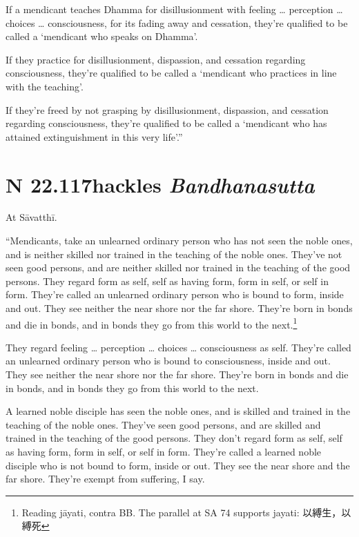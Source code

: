 \documentclass[12pt,openany]{book}%
\newcommand*{\suttatitleacronym}[1]{\smaller[2]{#1}\vspace*{.3em}}
\newcommand*{\suttatitletranslation}[1]{\linebreak{#1}}
\newcommand*{\suttatitleroot}[1]{\linebreak\smaller[2]\itshape{#1}}
\newcommand*{\tocacronym}[1]{\hspace*{-3.3em}{#1}\quad}
\newcommand*{\toctranslation}[1]{#1}
\newcommand*{\tocroot}[1]{(\textit{#1})}
\begin{document}
If a mendicant teaches Dhamma for disillusionment with feeling … perception … choices … consciousness, for its fading away and cessation, they’re qualified to be called a ‘mendicant who speaks on Dhamma’. 

If they practice for disillusionment, dispassion, and cessation regarding consciousness, they’re qualified to be called a ‘mendicant who practices in line with the teaching’. 

If they’re freed by not grasping by disillusionment, dispassion, and cessation regarding consciousness, they’re qualified to be called a ‘mendicant who has attained extinguishment in this very life’.” 

%
\section*{{\suttatitleacronym SN 22.117}{\suttatitletranslation Shackles }{\suttatitleroot Bandhanasutta}}
\addcontentsline{toc}{section}{\tocacronym{SN 22.117} \toctranslation{Shackles } \tocroot{Bandhanasutta}}

At \textsanskrit{Sāvatthī}. 

“Mendicants, take an unlearned ordinary person who has not seen the noble ones, and is neither skilled nor trained in the teaching of the noble ones. They’ve not seen good persons, and are neither skilled nor trained in the teaching of the good persons. They regard form as self, self as having form, form in self, or self in form. They’re called an unlearned ordinary person who is bound to form, inside and out. They see neither the near shore nor the far shore. They’re born in bonds and die in bonds, and in bonds they go from this world to the next.\footnote{Reading \textsanskrit{jāyati}, contra BB. The parallel at SA 74 supports jayati: 以縛生，以縛死 } 

They regard feeling … perception … choices … consciousness as self. They’re called an unlearned ordinary person who is bound to consciousness, inside and out. They see neither the near shore nor the far shore. They’re born in bonds and die in bonds, and in bonds they go from this world to the next. 

A learned noble disciple has seen the noble ones, and is skilled and trained in the teaching of the noble ones. They’ve seen good persons, and are skilled and trained in the teaching of the good persons. They don’t regard form as self, self as having form, form in self, or self in form. They’re called a learned noble disciple who is not bound to form, inside or out. They see the near shore and the far shore. They’re exempt from suffering, I say. 
\end{document}
